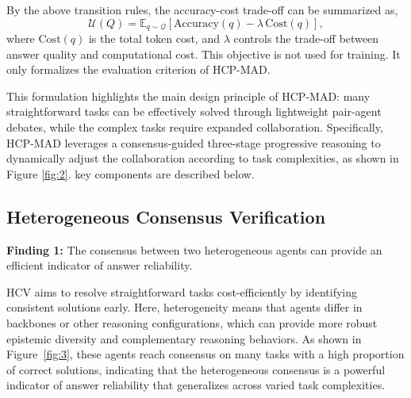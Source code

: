 \documentclass[11pt]{article}
\begin{document}
By the above transition rules, the accuracy-cost trade-off can be summarized as, %
\begin{equation}
\mathcal{U}(Q)
=
\mathbb{E}_{q\sim\mathcal{Q}}
\left[
\mathrm{Accuracy}(q)- \lambda\,\mathrm{Cost}(q)
\right],
\end{equation}
where %
\(\mathrm{Cost}(q)\)
is the total token cost, 
and \(\lambda\) controls the
trade-off between answer quality and computational cost. This objective is
not used for training. It only formalizes the evaluation criterion of
HCP-MAD. 

This formulation highlights the main design principle of HCP-MAD:
many straightforward tasks can be effectively solved through lightweight pair-agent debates, while the complex tasks require expanded collaboration. Specifically, HCP-MAD leverages a consensus-guided three-stage progressive reasoning to dynamically adjust the collaboration according to task complexities, as shown in Figure \ref{fig:2}. key components are described below.



\subsection{Heterogeneous Consensus Verification}
\label{sec:stage1}

\begin{tcolorbox}[
    colframe=green!40!black,
    colback=white,
    boxrule=0.7pt,
    arc=2pt,
    boxsep=0pt,
    left=5pt,
    right=5pt,
    top=2pt,
    bottom=2pt,
    before skip=3pt,
    after skip=6pt
]
\noindent\textbf{\textcolor{green!40!black}{Finding 1:}}
The consensus between two heterogeneous agents can provide an efficient indicator of answer reliability.
\end{tcolorbox}
HCV aims to resolve straightforward tasks  cost-efficiently by identifying consistent solutions early.  Here, heterogeneity means that agents differ in backbones or other reasoning configurations, which can provide more robust epistemic diversity and complementary reasoning behaviors.
As shown in Figure~\ref{fig:3}, these agents reach consensus on many tasks with a high proportion of correct solutions, indicating that the heterogeneous consensus is a powerful indicator of answer reliability that generalizes across varied task complexities. 
\end{document}
